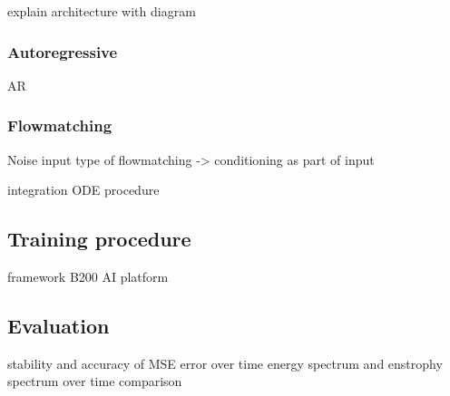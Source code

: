 explain architecture with diagram

\subsubsection{Autoregressive}

AR

\subsubsection{Flowmatching}

Noise input 
type of flowmatching -> conditioning as part of input

integration ODE procedure

\subsection{Training procedure}

framework
B200 AI platform

\subsection{Evaluation}

stability and accuracy of MSE error over time
energy spectrum and enstrophy spectrum over time
comparison
